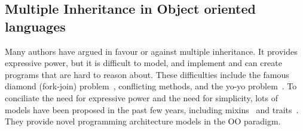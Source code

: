\subsection{Multiple Inheritance in Object oriented languages}
Many authors have argued in favour or against multiple inheritance.
It provides expressive power, but it is difficult to model, and implement and can create programs that are hard to reason about.
These difficulties include the famous
diamond (fork-join) problem~\cite{bracha90mixin,Sak89dis}, conflicting methods, and the yo-yo problem~\cite{taenzer1989problems}.
To conciliate the need for expressive power and the need for simplicity, 
lots of models have been proposed in the past few
years, including mixins~\cite{bracha90mixin} and traits~\cite{scharli03traits}.
They provide novel programming architecture models in the
OO paradigm. 
